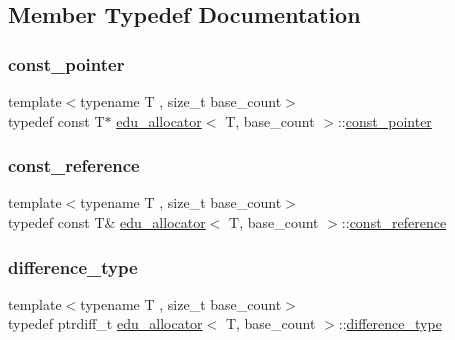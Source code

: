 \subsection{Member Typedef Documentation}
\mbox{\label{classedu__allocator_aabb40d46b7dfb72ce0c3eed984a771fa}} 
\subsubsection{\texorpdfstring{const\+\_\+pointer}{const\_pointer}}
{\footnotesize\ttfamily template$<$typename T , size\+\_\+t base\+\_\+count$>$ \\
typedef const T$\ast$ \hyperlink{classedu__allocator}{edu\+\_\+allocator}$<$ T, base\+\_\+count $>$\+::\hyperlink{classedu__allocator_aabb40d46b7dfb72ce0c3eed984a771fa}{const\+\_\+pointer}}

\mbox{\label{classedu__allocator_aa0ca747c0a96c4b00eec6c6a93d329e7}} 
\subsubsection{\texorpdfstring{const\+\_\+reference}{const\_reference}}
{\footnotesize\ttfamily template$<$typename T , size\+\_\+t base\+\_\+count$>$ \\
typedef const T\& \hyperlink{classedu__allocator}{edu\+\_\+allocator}$<$ T, base\+\_\+count $>$\+::\hyperlink{classedu__allocator_aa0ca747c0a96c4b00eec6c6a93d329e7}{const\+\_\+reference}}

\mbox{\label{classedu__allocator_a7c64dafebaa7cde1a37248caba0226ca}} 
\subsubsection{\texorpdfstring{difference\+\_\+type}{difference\_type}}
{\footnotesize\ttfamily template$<$typename T , size\+\_\+t base\+\_\+count$>$ \\
typedef ptrdiff\+\_\+t \hyperlink{classedu__allocator}{edu\+\_\+allocator}$<$ T, base\+\_\+count $>$\+::\hyperlink{classedu__allocator_a7c64dafebaa7cde1a37248caba0226ca}{difference\+\_\+type}}


